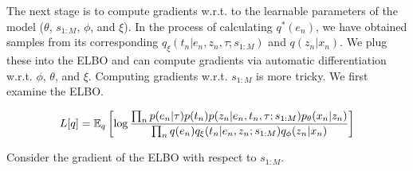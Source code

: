 The next stage is to compute gradients w.r.t. to the
learnable parameters of the model ($\theta$, $s_{1:M}$, $\phi$, and $\xi$).
In the process of calculating $q^*(e_n)$,
we have obtained samples from its corresponding 
$q_\xi(t_n | e_n, z_n, \tau; s_{1:M})$ and $q(z_n | x_n)$.
We plug these into the ELBO and can compute
gradients via automatic differentiation w.r.t. $\phi$,
$\theta$, and $\xi$. Computing gradients w.r.t.
$s_{1:M}$ is more tricky. We first examine the ELBO.

\begin{equation}
    L[q] = \mathbb{E}_q \left[\log \frac{\prod_n p(e_n|\tau) p(t_n) p(z_n | e_n, t_n, \tau; s_{1:M})p_\theta(x_n | z_n)}{\prod_n q(e_n)q_{\xi}(t_n | e_n, z_n; s_{1:M})q_\phi(z_n | x_n)}\right]
\end{equation}

Consider the gradient of the ELBO with respect to $s_{1:M}$.

